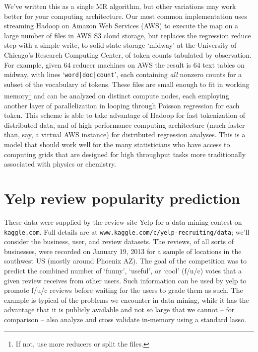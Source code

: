 \documentclass[12pt]{article}
\newcommand{\cd}[1]{{\tt#1}}
\begin{document}
We've written this as a single MR algorithm, but other variations may work better for your computing architecture. Our most common implementation uses streaming Hadoop on Amazon Web Services (AWS) to execute the map on a large number of files in AWS S3 cloud storage, but replaces the regression reduce step with a simple write, to solid state storage `midway' at the University of Chicago's Research Computing Center, of token counts tabulated by observation.  For example, given 64 reducer machines on AWS the result is 64 text tables on midway, with lines `\cd{word|doc|count}', each containing {\it all} nonzero counts for a subset of the vocabulary of tokens.  These files are small enough to fit in working memory\footnote{If not, use more reducers or split the files.} and can be analyzed on distinct compute nodes, each employing another layer of parallelization in looping through Poisson regression for each token.  This scheme is able to take advantage of Hadoop for fast tokenization of distributed data, and of
high performance computing architecture (much faster than, say, a virtual AWS instance) for distributed  regression analyses.  This is a model that should work well for the many statisticians who have access to computing grids that are designed for high throughput tasks more traditionally associated with physics or chemistry.


\section{Yelp review popularity prediction}
\label{YELP}

These data were supplied by the review site Yelp for a data mining contest on \cd{kaggle.com}.  Full details are at \cd{www.kaggle.com/c/yelp\!-\!recruiting/data}; we'll consider the business, user, and review datasets.  The reviews, of all sorts of businesses, were recorded on January 19, 2013 for a sample of locations in the southwest US (mostly around Phoenix AZ).  The goal of the competition was to predict the combined number of `funny', `useful', or `cool' (f/u/c) votes that a given review receives from other users.  Such information can be used by yelp to promote f/u/c  reviews before waiting for the users to grade them as such.  
The example is typical of the problems we encounter in data mining, while it has the advantage that it is publicly available and not so large that we cannot -- for comparison -- also analyze and cross validate in-memory using a standard lasso.
\end{document}
